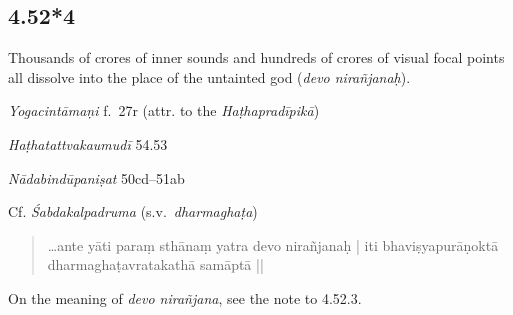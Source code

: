\begin{ekdosis}
\subsection*{4.52*4}
\begin{translation}[hp04_052_4]
Thousands of crores of inner sounds and hundreds of crores of visual focal points all dissolve into the place of the untainted god (\emph{devo nirañjanaḥ}).
%
\end{translation}


\begin{testimonia}[hp04_052_4]
\emph{Yogacintāmaṇi} f.~27r (attr. to the \emph{Haṭhapradīpikā})
\begin{versinnote}
\end{versinnote}

\emph{Haṭhatattvakaumudī} 54.53
\begin{versinnote}
\end{versinnote}

\emph{Nādabindūpaniṣat} 50cd--51ab
\begin{versinnote}
\end{versinnote}

Cf. \emph{Śabdakalpadruma} (s.v.~\emph{dharmaghaṭa})
\begin{quote}
\dots ante yāti paraṃ sthānaṃ yatra devo nirañjanaḥ |
iti bhaviṣyapurāṇoktā dharmaghaṭavratakathā samāptā ||
\end{quote}
\end{testimonia}

\begin{philcomm}[hp04_052_4]
On the meaning of \emph{devo nirañjana}, see the note to 4.52.3.

\end{philcomm}



\end{ekdosis}
